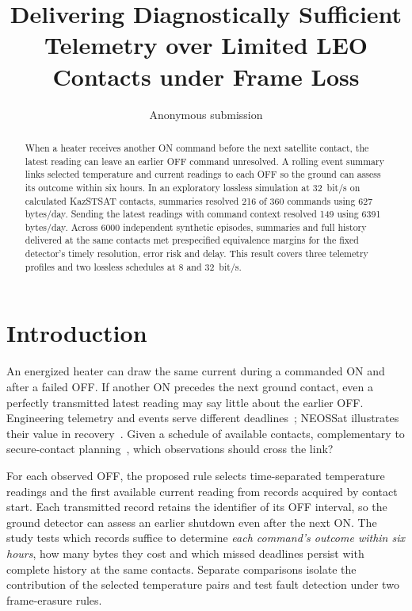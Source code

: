 \documentclass[a4paper]{llncs}
\title{Delivering Diagnostically Sufficient Telemetry over Limited LEO Contacts under Frame Loss}
\author{Anonymous submission}
\institute{}
\begin{document}
\raggedbottom
\maketitle
\begin{abstract}
When a heater receives another ON command before the next satellite contact, the latest reading can leave an earlier OFF command unresolved. A rolling event summary links selected temperature and current readings to each OFF so the ground can assess its outcome within six hours. In an exploratory lossless simulation at 32~bit/s on calculated KazSTSAT contacts, summaries resolved 216 of 360 commands using 627 bytes/day. Sending the latest readings with command context resolved 149 using 6391 bytes/day. Across 6000 independent synthetic episodes, summaries and full history delivered at the same contacts met prespecified equivalence margins for the fixed detector's timely resolution, error risk and delay. This result covers three telemetry profiles and two lossless schedules at 8 and 32~bit/s.  
\end{abstract}
\section{Introduction}

An energized heater can draw the same current during a commanded ON and after a failed OFF. If another ON precedes the next ground contact, even a perfectly transmitted latest reading may say little about the earlier OFF. Engineering telemetry and events serve different deadlines~\cite{carsten2024}; NEOSSat illustrates their value in recovery~\cite{neossat2023}. Given a schedule of available contacts, complementary to secure-contact planning~\cite{r1}, which observations should cross the link?

For each observed OFF, the proposed rule selects time-separated temperature readings and the first available current reading from records acquired by contact start. Each transmitted record retains the identifier of its OFF interval, so the ground detector can assess an earlier shutdown even after the next ON. The study tests which records suffice to determine \emph{each command's outcome within six hours}, how many bytes they cost and which missed deadlines persist with complete history at the same contacts. Separate comparisons isolate the contribution of the selected temperature pairs and test fault detection under two frame-erasure rules.
\end{document}
